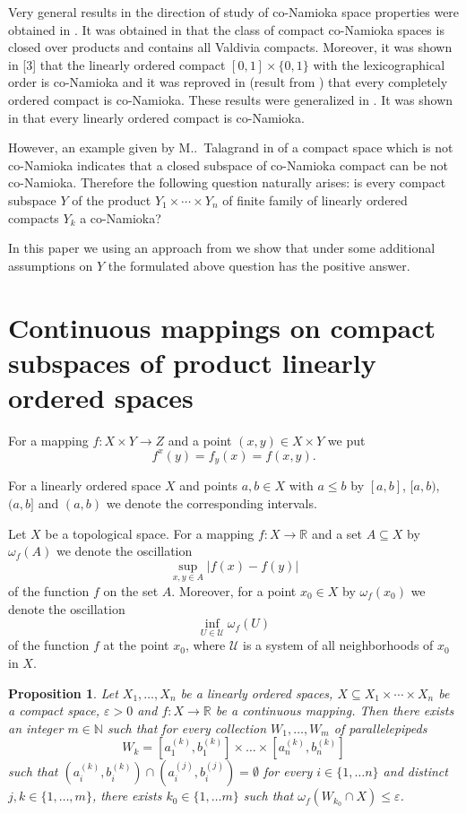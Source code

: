 \documentclass{amsart}
\newtheorem{proposition}[theorem]{Proposition}
\begin{document}
Very general results in the direction of study of co-Namioka space properties were obtained in \cite{Bu1, Bu2}. It was obtained in \cite{Bu1, Bu2} that the class of compact co-Namioka spaces is closed over products and contains all Valdivia compacts. Moreover, it was shown in [3] that the linearly ordered compact $[0,1]\times \{0,1\}$ with the lexicographical order is co-Namioka and it was reproved in \cite{Bu1}  (result from \cite{De}) that every completely ordered compact is co-Namioka. These results were generalized in \cite{M}. It was shown in \cite{M} that every linearly ordered compact is co-Namioka.

However, an example given by M..~Talagrand in \cite{T} of a compact space which is not co-Namioka indicates that a closed subspace of co-Namioka compact can be not co-Namioka. Therefore the following question naturally arises: is every compact subspace $Y$ of the product $Y_1\times\cdots \times Y_n$ of finite family of linearly ordered compacts $Y_k$ a co-Namioka?

In this paper we using an approach from \cite{M} we show that under some additional assumptions on $Y$ the formulated above question has the positive answer.

\section{Continuous mappings on compact subspaces of product linearly ordered spaces}

For a mapping $f:X\times Y\to Z$ and a point $(x,y)\in X\times Y$ we put $$f^x(y)=f_y(x)=f(x,y).$$

For a linearly ordered space $X$ and points $a,b\in X$ with $a\leq b$ by $[a,b]$, $[a,b)$, $(a,b]$ and $(a,b)$ we denote the corresponding intervals.

Let $X$ be a topological space. For a mapping $f:X\to\mathbb R$ and a set $A\subseteq X$ by $\omega_f(A)$ we denote the oscillation 
$$\sup\limits_{x,y\in A}|f(x)-f(y)|$$ of the function $f$ on the set $A$. Moreover, for a point $x_0\in X$ by $\omega_f(x_0)$ we denote the oscillation  $$\inf\limits_{U\in{\mathcal U}}\omega_f(U)$$ of the function $f$ at the point $x_0$, where ${\mathcal U}$ is a system of all neighborhoods of $x_0$ in $X$.

\begin{proposition}\label{pr:3.1}
  Let $X_1,\dots, X_n$ be a linearly ordered spaces, $X\subseteq X_1\times\cdots \times X_n$ be a compact space, $\varepsilon >0$ and $f:X\to \mathbb R$ be a continuous mapping. Then there exists an integer $m\in\mathbb N$ such that for every collection $W_1,\dots, W_m$ of parallelepipeds  $$W_k=[a_1^{(k)},b_1^{(k)}]\times\dots\times [a_n^{(k)},b_n^{(k)}]$$ such that $(a_i^{(k)},b_i^{(k)})\cap(a_i^{(j)},b_i^{(j)})=\emptyset$ for every $i\in\{1,\dots n\}$ and distinct $j,k\in \{1,\dots, m\}$, there exists $k_0\in\{1,\dots m\}$ such that $\omega_f(W_{k_0}\cap X)\leq \varepsilon$.
\end{proposition}
\end{document}
